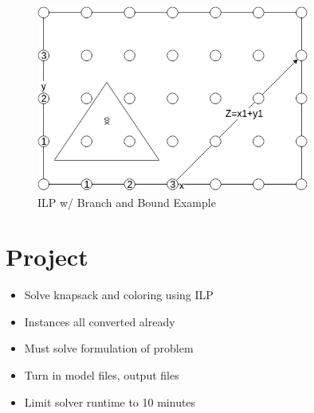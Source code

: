 \documentclass[12pt, letter]{article}
\begin{document}
\begin{figure}[h]
	\centering
	\includegraphics[width=0.8\textwidth]{bandb}
	\caption{ILP w/ Branch and Bound Example}
	\label{fig:bandb}
\end{figure}

\section{Project}%
\label{sec:project}
\begin{itemize}
	\item Solve knapsack and coloring using ILP
	\item Instances all converted already
	\item Must solve formulation of problem
	\item Turn in model files, output files
	\item Limit solver runtime to 10 minutes
\end{itemize}
\end{document}
